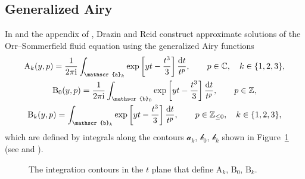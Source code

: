 \documentclass[10pt,a4paper]{amsart}
\newcommand{\Z}{\mathbb{Z}}
\newcommand{\C}{\mathbb{C}}
\numberwithin{equation}{section}
\begin{document}
\subsection{Generalized Airy}\label{sec:gen-airy}
%
In \cite{Reid} and the appendix of \cite{drazin-reid}, Drazin and Reid construct approximate solutions of the Orr--Sommerfield fluid equation using the generalized Airy functions
\begin{gather*}
\mathrm{A}_k(y,p) = \frac{1}{2 \pi {\rm i}}\int_{\mathscr{a}_k} \exp\left[yt-\frac{t^3}{3}\right] \frac{{\rm d}t}{t^p} ,\qquad p \in \C ,\quad k \in \{1,2,3\}, \\
\mathrm{B}_0(y,p) = \frac{1}{2 \pi {\rm i}}\int_{\mathscr{b}_0} \exp\left[yt-\frac{t^3}{3}\right] \frac{{\rm d}t}{t^p} ,\qquad p \in \Z ,\\
\mathrm{B}_k(y,p) = \int_{\mathscr{b}_k} \exp\left[yt-\frac{t^3}{3}\right] \frac{{\rm d}t}{t^p} ,\qquad p \in \Z_{\le 0},\quad k \in \{1,2,3\},
\end{gather*}
which are defined by integrals along the contours $\mathscr{a}_k$, $\mathscr{b}_0$, $\mathscr{b}_k$ shown in Figure~\ref{fig:path-generalized-Airy} (see \cite{drazin-reid} and \cite[Section~9.13\,(ii)]{dlmf}).
\begin{figure}[!ht]
\centering
\newcommand{\apathcolor}{ietcoast}
\newcommand{\bpathcolor}{black}
\caption{The integration contours in the $t$ plane that define $\mathrm{A}_k$, $\mathrm{B}_0$, $\mathrm{B}_k$.}\label{fig:path-generalized-Airy}
\end{figure}
\end{document}
